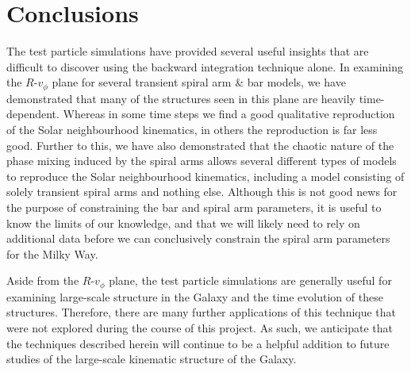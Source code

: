 \documentclass[10pt]{article}
\begin{document}
\section{Conclusions}
The test particle simulations have provided several useful insights that are difficult to discover using the backward integration technique alone. In examining the $R$-$v_\phi$ plane for several transient spiral arm \& bar models, we have demonstrated that many of the structures seen in this plane are heavily time-dependent. Whereas in some time steps we find a good qualitative reproduction of the Solar neighbourhood kinematics, in others the reproduction is far less good. Further to this, we have also demonstrated that the chaotic nature of the phase mixing induced by the spiral arms allows several different types of models to reproduce the Solar neighbourhood kinematics, including a model consisting of solely transient spiral arms and nothing else. Although this is not good news for the purpose of constraining the bar and spiral arm parameters, it is useful to know the limits of our knowledge, and that we will likely need to rely on additional data before we can conclusively constrain the spiral arm parameters for the Milky Way.

Aside from the $R$-$v_\phi$ plane, the test particle simulations are generally useful for examining large-scale structure in the Galaxy and the time evolution of these structures. Therefore, there are many further applications of this technique that were not explored during the course of this project. As such, we anticipate that the techniques described herein will continue to be a helpful addition to future studies of the large-scale kinematic structure of the Galaxy.

\printbibliography
\end{document}
